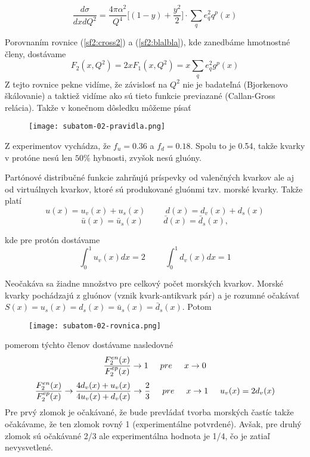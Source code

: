 \documentclass[../../main.tex]{subfiles}
\begin{document}
\begin{equation}
\frac{d\sigma}{dxdQ^2} = \frac{4\pi\alpha^2}{Q^4}\bigg[ (1-y)+\frac{y^2}{2} \bigg]\cdot \sum_q e^2_q q^p(x)
\label{sf2:cross2}
\end{equation}

Porovnaním rovnice (\ref{sf2:cross2}) a (\ref{sf2:blalbla}), kde zanedbáme hmotnostné členy, dostávame
$$ F_2(x,Q^2)=2xF_1(x,Q^2)=x\sum_q e^2_qg^p(x) $$
Z tejto rovnice pekne vidíme, že závislosť na $Q^2$ nie je badateľná (Bjorkenovo škálovanie) a taktiež vidíme ako sú tieto funkcie previazané (Callan-Gross relácia). Takže v konečnom dôsledku môžeme písať

\begin{figure}[!h]
\texttt{[image: subatom-02-pravidla.png]}
\centering
\end{figure}

Z experimentov vychádza, že $f_u=0.36$ a $f_d=0.18$. Spolu to je 0.54, takže kvarky v protóne nesú len $50\%$ hybnosti, zvyšok nesú gluóny.

Partónové distribučné funkcie zahrňujú príspevky od valenčných kvarkov ale aj od virtuálnych kvarkov, ktoré sú produkované gluónmi tzv. morské kvarky.
Takže platí
$$ u(x) = u_v(x)+u_s(x) \hspace{1cm} d(x) = d_v(x)+d_s(x) $$
$$ \bar{u}(x) = \bar{u}_s(x) \hspace{1cm} \bar{d}(x) = \bar{d}_s(x),$$

kde pre protón dostávame
$$ \int_0^1u_v(x)dx=2 \hspace{1cm} \int_0^1d_v(x)dx=1 $$
 
Neočakáva sa žiadne množstvo pre celkový počet morských kvarkov. Morské kvarky pochádzajú z gluónov (vznik kvark-antikvark pár) a je rozumné očakávať $S(x)=u_s(x)=d_s(x)=\bar{u}_s(x)=\bar{d}_s(x)$. Potom 

\begin{figure}[!h]
\texttt{[image: subatom-02-rovnica.png]}
\centering
\end{figure}

pomerom týchto členov dostávame nasledovné
$$ \frac{F^{en}_2(x)}{F^{ep}_2(x)}\rightarrow 1 \hspace{0.5cm} pre \hspace{0.5cm} x\rightarrow 0 $$
$$ \frac{F^{en}_2(x)}{F^{ep}_2(x)}\rightarrow \frac{4d_v(x)+u_v(x)}{4u_v(x)+d_v(x)} \rightarrow \frac{2}{3} \hspace{0.5cm} pre \hspace{0.5cm} x\rightarrow 1 \hspace{0.5cm} u_v(x)=2d_v(x) $$
Pre prvý zlomok je očakávané, že bude prevládať tvorba morských častíc takže očakávame, že ten zlomok rovný 1 (experimentálne potvrdené). Avšak, pre druhý zlomok sú očakávané 2/3 ale experimentálna hodnota je 1/4, čo je zatiaľ nevysvetlené.
\end{document}

